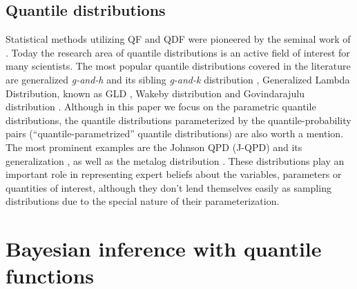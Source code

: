 \documentclass[
  12pt,
]{article}
\begin{document}
\hypertarget{quantile-distributions}{%
\subsection{Quantile distributions}\label{quantile-distributions}}

Statistical methods utilizing QF and QDF were pioneered by the seminal work of \citet{parzen1979NonparametricStatisticalData}. Today the research area of quantile distributions is an active field of interest for many scientists. The most popular quantile distributions covered in the literature are generalized \emph{g-and-h} and its sibling \emph{g-and-k} distribution \citep{haynes2005BayesianEstimationGandk, jacob2017LikelihoodCalculationGandk, prangle2017GkPackageGandk, rayner2002NumericalMaximumLikelihood}, Generalized Lambda Distribution, known as GLD \citep{aldeni2017FamiliesDistributionsArising, chalabi2012FlexibleDistributionModeling, dedduwakumara2021EfficientEstimatorParameters, fournier2007EstimatingParametersGeneralizeda, freimer1988StudyGeneralizedTukey}, Wakeby distribution \citep{rahman2015ApplicabilityWakebyDistribution} and Govindarajulu distribution \citep{nair2012GovindarajuluDistributionProperties, nair2013QuantileBasedReliabilityAnalysis}. Although in this paper we focus on the parametric quantile distributions, the quantile distributions parameterized by the quantile-probability pairs (``quantile-parametrized'' quantile distributions) are also worth a mention. The most prominent examples are the Johnson QPD (J-QPD) and its generalization \citep{hadlock2017JohnsonQuantileParameterizedDistributions, hadlock2019GeneralizedJohnsonQuantileParameterized}, as well as the metalog distribution \citep{keelin2016MetalogDistributions, keelin2011QuantileParameterizedDistributions}. These distributions play an important role in representing expert beliefs about the variables, parameters or quantities of interest, although they don't lend themselves easily as sampling distributions due to the special nature of their parameterization.

\hypertarget{bayesian-inference-with-quantile-functions}{%
\section{Bayesian inference with quantile functions}\label{bayesian-inference-with-quantile-functions}}
\end{document}
